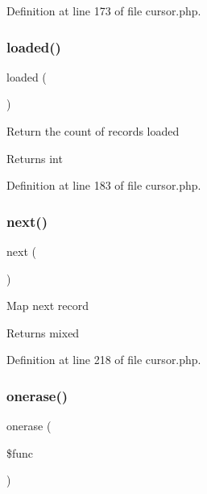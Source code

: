 Definition at line 173 of file cursor.\+php.

\hypertarget{class_d_b_1_1_cursor_a3f07a4aa73e71d525744db933bc2aff4}{}\label{class_d_b_1_1_cursor_a3f07a4aa73e71d525744db933bc2aff4} 
\subsubsection{\texorpdfstring{loaded()}{loaded()}}
{\footnotesize\ttfamily loaded (\begin{DoxyParamCaption}{ }\end{DoxyParamCaption})}

Return the count of records loaded \begin{DoxyReturn}{Returns}
int 
\end{DoxyReturn}


Definition at line 183 of file cursor.\+php.

\hypertarget{class_d_b_1_1_cursor_acea62048bfee7b3cd80ed446c86fb78a}{}\label{class_d_b_1_1_cursor_acea62048bfee7b3cd80ed446c86fb78a} 
\subsubsection{\texorpdfstring{next()}{next()}}
{\footnotesize\ttfamily next (\begin{DoxyParamCaption}{ }\end{DoxyParamCaption})}

Map next record \begin{DoxyReturn}{Returns}
mixed 
\end{DoxyReturn}


Definition at line 218 of file cursor.\+php.

\hypertarget{class_d_b_1_1_cursor_aebef85c8e2c1ece8cb36a60dc332595f}{}\label{class_d_b_1_1_cursor_aebef85c8e2c1ece8cb36a60dc332595f} 
\subsubsection{\texorpdfstring{onerase()}{onerase()}}
{\footnotesize\ttfamily onerase (\begin{DoxyParamCaption}\item[{}]{\$func }\end{DoxyParamCaption})}

